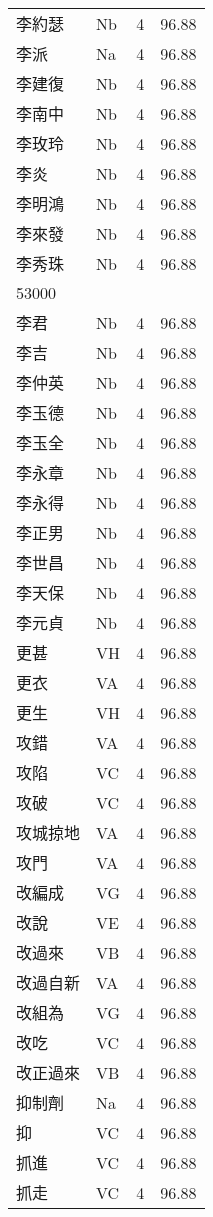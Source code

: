 \documentclass[twocolumn]{book}
\begin{document}
\begin{supertabular}{llrr}
李約瑟 & Nb & 4 &  96.88\\
李派 & Na & 4 &  96.88\\
李建復 & Nb & 4 &  96.88\\
李南中 & Nb & 4 &  96.88\\
李玫玲 & Nb & 4 &  96.88\\
李炎 & Nb & 4 &  96.88\\
李明鴻 & Nb & 4 &  96.88\\
李來發 & Nb & 4 &  96.88\\
李秀珠 & Nb & 4 &  96.88\\
53000\\
李君 & Nb & 4 &  96.88\\
李吉 & Nb & 4 &  96.88\\
李仲英 & Nb & 4 &  96.88\\
李玉德 & Nb & 4 &  96.88\\
李玉全 & Nb & 4 &  96.88\\
李永章 & Nb & 4 &  96.88\\
李永得 & Nb & 4 &  96.88\\
李正男 & Nb & 4 &  96.88\\
李世昌 & Nb & 4 &  96.88\\
李天保 & Nb & 4 &  96.88\\
李元貞 & Nb & 4 &  96.88\\
更甚 & VH & 4 &  96.88\\
更衣 & VA & 4 &  96.88\\
更生 & VH & 4 &  96.88\\
攻錯 & VA & 4 &  96.88\\
攻陷 & VC & 4 &  96.88\\
攻破 & VC & 4 &  96.88\\
攻城掠地 & VA & 4 &  96.88\\
攻門 & VA & 4 &  96.88\\
改編成 & VG & 4 &  96.88\\
改說 & VE & 4 &  96.88\\
改過來 & VB & 4 &  96.88\\
改過自新 & VA & 4 &  96.88\\
改組為 & VG & 4 &  96.88\\
改吃 & VC & 4 &  96.88\\
改正過來 & VB & 4 &  96.88\\
抑制劑 & Na & 4 &  96.88\\
抑 & VC & 4 &  96.88\\
抓進 & VC & 4 &  96.88\\
抓走 & VC & 4 &  96.88\\

\end{supertabular}
\end{document}

